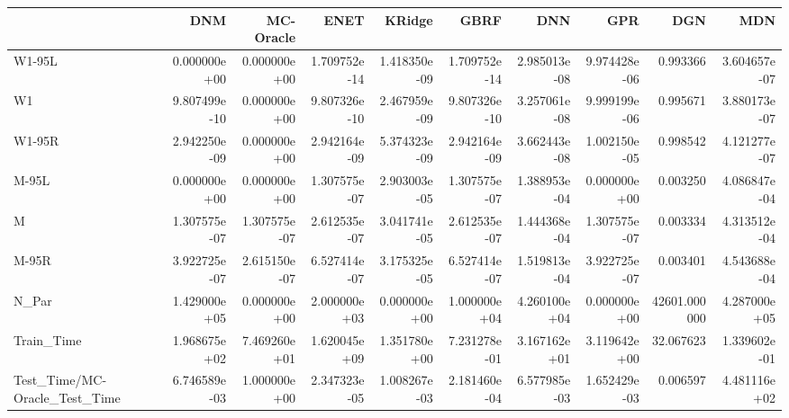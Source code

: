 \begin{tabular}{lrrrrrrrrr}
\toprule
{} &           DNM &     MC-Oracle &          ENET &        KRidge &          GBRF &           DNN &           GPR &           DGN &           MDN \\
\midrule
W1-95L                        &  0.000000e+00 &  0.000000e+00 &  1.709752e-14 &  1.418350e-09 &  1.709752e-14 &  2.985013e-08 &  9.974428e-06 &      0.993366 &  3.604657e-07 \\
W1                            &  9.807499e-10 &  0.000000e+00 &  9.807326e-10 &  2.467959e-09 &  9.807326e-10 &  3.257061e-08 &  9.999199e-06 &      0.995671 &  3.880173e-07 \\
W1-95R                        &  2.942250e-09 &  0.000000e+00 &  2.942164e-09 &  5.374323e-09 &  2.942164e-09 &  3.662443e-08 &  1.002150e-05 &      0.998542 &  4.121277e-07 \\
M-95L                         &  0.000000e+00 &  0.000000e+00 &  1.307575e-07 &  2.903003e-05 &  1.307575e-07 &  1.388953e-04 &  0.000000e+00 &      0.003250 &  4.086847e-04 \\
M                             &  1.307575e-07 &  1.307575e-07 &  2.612535e-07 &  3.041741e-05 &  2.612535e-07 &  1.444368e-04 &  1.307575e-07 &      0.003334 &  4.313512e-04 \\
M-95R                         &  3.922725e-07 &  2.615150e-07 &  6.527414e-07 &  3.175325e-05 &  6.527414e-07 &  1.519813e-04 &  3.922725e-07 &      0.003401 &  4.543688e-04 \\
N\_Par                         &  1.429000e+05 &  0.000000e+00 &  2.000000e+03 &  0.000000e+00 &  1.000000e+04 &  4.260100e+04 &  0.000000e+00 &  42601.000000 &  4.287000e+05 \\
Train\_Time                    &  1.968675e+02 &  7.469260e+01 &  1.620045e+09 &  1.351780e+00 &  7.231278e-01 &  3.167162e+01 &  3.119642e+00 &     32.067623 &  1.339602e-01 \\
Test\_Time/MC-Oracle\_Test\_Time &  6.746589e-03 &  1.000000e+00 &  2.347323e-05 &  1.008267e-03 &  2.181460e-04 &  6.577985e-03 &  1.652429e-03 &      0.006597 &  4.481116e+02 \\
\bottomrule
\end{tabular}
